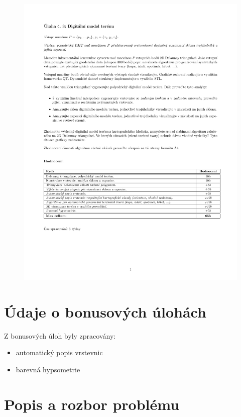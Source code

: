\documentclass[a4paper, 12pt]{article}
\begin{document}
\begin{figure}[h!]
	\includegraphics[clip, trim=0cm 5cm 0cm 3cm, width=1.0\textwidth]{zadani.pdf}
\end{figure}


\section{Údaje o bonusových úlohách}
Z bonusových úloh byly zpracovány:
\begin{itemize}
	\item automatický popis vrstevnic
	\item barevná hypsometrie
\end{itemize}



\clearpage

\section{Popis a rozbor problému}
\end{document}
